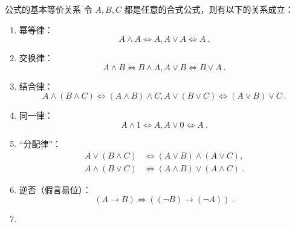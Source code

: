 
\begin{theorem}{公式的基本等价关系}
令 $A, B, C$ 都是任意的合式公式，则有以下的关系成立：
\begin{enumerate}
\item 幂等律：
\begin{equation}
A \land A \Leftrightarrow A, A \lor A \Leftrightarrow A~.
\end{equation}
\item 交换律：
\begin{equation}
A \land B \Leftrightarrow B \land A, A \lor B \Leftrightarrow B \lor A ~.
\end{equation}
\item 结合律：
\begin{equation}
A \land (B \land C) \Leftrightarrow (A \land B) \land C, A \lor (B \lor C) \Leftrightarrow (A \lor B) \lor C ~.
\end{equation}
\item 同一律：
\begin{equation}
A \land 1 \Leftrightarrow A, A \lor 0 \Leftrightarrow A ~.
\end{equation}
\item “分配律”：
\begin{equation}
\begin{aligned}
A \lor (B \land C) &\Leftrightarrow (A \lor B) \land (A \lor C) ,\\
A \land (B \lor C) &\Leftrightarrow (A \land B) \lor (A \land C) ~.
\end{aligned}
\end{equation}
\item 逆否（假言易位）：
\begin{equation}
(A \to B) \Leftrightarrow ((\neg B) \to (\neg A)) ~.
\end{equation}
\item 
\end{enumerate}
\end{theorem}